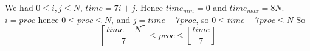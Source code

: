 \documentclass{article}
\begin{document}
We had $0\leq i,j \leq N$, $time=7i+j$. Hence $time_{min}=0$ and $time_{max}=8N$.\\
$i=proc$ hence $0\leq proc \leq N$, and $j=time-7proc$, so $0\leq time-7proc\leq N$
So
\[\left\lceil \frac{time-N}{7}\right\rceil \leq proc \leq \left\lfloor \frac{time}{7} \right\rfloor\]

\begin{algorithm}
\end{algorithm}
\end{document}
